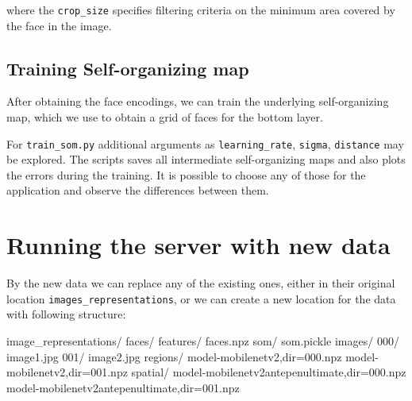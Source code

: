 where the \verb+crop_size+ specifies filtering criteria on the minimum area covered by the face in the image.

\subsection{Training Self-organizing map}

After obtaining the face encodings, we can train the underlying self-organizing map, which we use to obtain a grid of faces for the bottom layer.


\vspace{0.5cm}
\vspace{0.5cm}

For \verb+train_som.py+ additional arguments as \verb+learning_rate+, \verb+sigma+, \verb+distance+ may be explored. The scripts saves all intermediate self-organizing maps and also plots the errors during the training. It is possible to choose any of those for the application and observe the differences between them.

\section{Running the server with new data}

By the new data we can replace any of the existing ones, either in their original location \verb+images_representations+, or we can create a new location for the data with following structure:


\vspace{0.5cm}
\begin{boxedverbatim}
image_representations/
    faces/
        features/
            faces.npz
        som/
            som.pickle
    images/
        000/
            image1.jpg
        001/
            image2.jpg
    regions/
        model-mobilenetv2,dir=000.npz
        model-mobilenetv2,dir=001.npz
    spatial/
        model-mobilenetv2antepenultimate,dir=000.npz
        model-mobilenetv2antepenultimate,dir=001.npz
\end{boxedverbatim}
\vspace{0.5cm}

